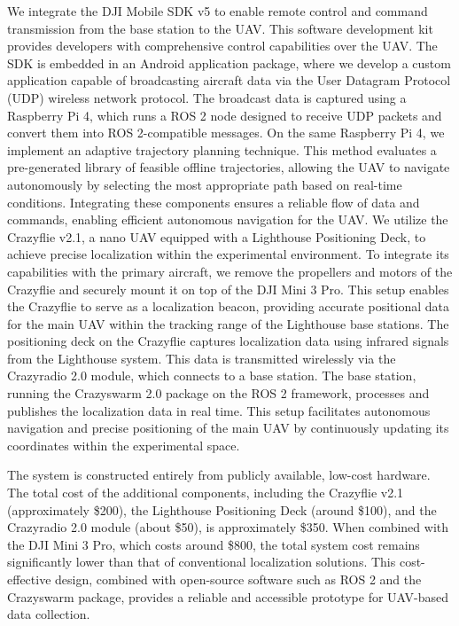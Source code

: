 We integrate the DJI Mobile SDK v5 to enable remote control and command transmission from the base station to the UAV.  
This software development kit provides developers with comprehensive control capabilities over the UAV.  
The SDK is embedded in an Android application package, where we develop a custom application capable of broadcasting aircraft data via the User Datagram Protocol (UDP) wireless network protocol.  
The broadcast data is captured using a Raspberry Pi 4, which runs a ROS 2 node designed to receive UDP packets and convert them into ROS 2-compatible messages.  
On the same Raspberry Pi 4, we implement an adaptive trajectory planning technique.  
This method evaluates a pre-generated library of feasible offline trajectories, allowing the UAV to navigate autonomously by selecting the most appropriate path based on real-time conditions.  
Integrating these components ensures a reliable flow of data and commands, enabling efficient autonomous navigation for the UAV.
We utilize the Crazyflie v2.1, a nano UAV equipped with a Lighthouse Positioning Deck, to achieve precise localization within the experimental environment.  
To integrate its capabilities with the primary aircraft, we remove the propellers and motors of the Crazyflie and securely mount it on top of the DJI Mini 3 Pro.  
This setup enables the Crazyflie to serve as a localization beacon, providing accurate positional data for the main UAV within the tracking range of the Lighthouse base stations.  
The positioning deck on the Crazyflie captures localization data using infrared signals from the Lighthouse system.  
This data is transmitted wirelessly via the Crazyradio 2.0 module, which connects to a base station.  
The base station, running the Crazyswarm 2.0 package on the ROS 2 framework, processes and publishes the localization data in real time.  
This setup facilitates autonomous navigation and precise positioning of the main UAV by continuously updating its coordinates within the experimental space.

The system is constructed entirely from publicly available, low-cost hardware.  
The total cost of the additional components, including the Crazyflie v2.1 (approximately \$200), the Lighthouse Positioning Deck (around \$100), and the Crazyradio 2.0 module (about \$50), is approximately \$350.  
When combined with the DJI Mini 3 Pro, which costs around \$800, the total system cost remains significantly lower than that of conventional localization solutions.  
This cost-effective design, combined with open-source software such as ROS 2 and the Crazyswarm package, provides a reliable and accessible prototype for UAV-based data collection.


